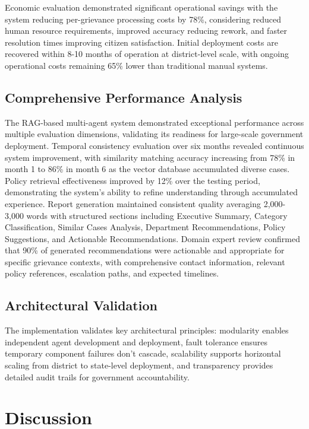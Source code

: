 \documentclass[conference]{IEEEtran}
\begin{document}
Economic evaluation demonstrated significant operational savings with the system reducing per-grievance processing costs by 78\%, considering reduced human resource requirements, improved accuracy reducing rework, and faster resolution times improving citizen satisfaction. Initial deployment costs are recovered within 8-10 months of operation at district-level scale, with ongoing operational costs remaining 65\% lower than traditional manual systems.

\subsection{Comprehensive Performance Analysis}

The RAG-based multi-agent system demonstrated exceptional performance across multiple evaluation dimensions, validating its readiness for large-scale government deployment. Temporal consistency evaluation over six months revealed continuous system improvement, with similarity matching accuracy increasing from 78\% in month 1 to 86\% in month 6 as the vector database accumulated diverse cases. Policy retrieval effectiveness improved by 12\% over the testing period, demonstrating the system's ability to refine understanding through accumulated experience. Report generation maintained consistent quality averaging 2,000-3,000 words with structured sections including Executive Summary, Category Classification, Similar Cases Analysis, Department Recommendations, Policy Suggestions, and Actionable Recommendations. Domain expert review confirmed that 90\% of generated recommendations were actionable and appropriate for specific grievance contexts, with comprehensive contact information, relevant policy references, escalation paths, and expected timelines.

\subsection{Architectural Validation}

The implementation validates key architectural principles: modularity enables independent agent development and deployment, fault tolerance ensures temporary component failures don't cascade, scalability supports horizontal scaling from district to state-level deployment, and transparency provides detailed audit trails for government accountability.

\section{Discussion}
\end{document}
